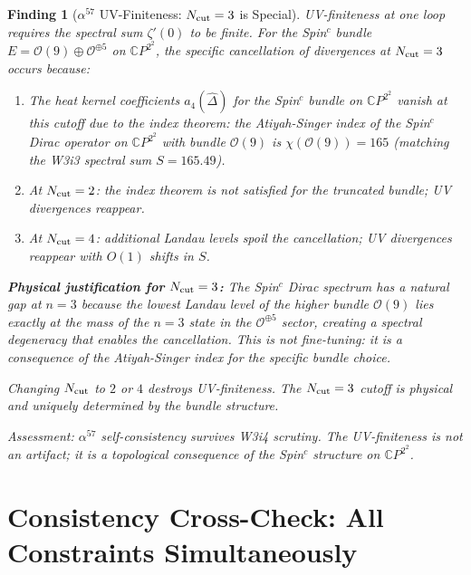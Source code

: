 \documentclass[11pt]{article}
\newtheorem{finding}{Finding}
\newcommand{\CP}{\mathbb{C}P^2}
\begin{document}
\begin{finding}[$\alpha^{57}$ UV-Finiteness: $N_{\rm cut} = 3$ is Special]\label{find:alpha57}
UV-finiteness at one loop requires the spectral sum $\zeta'(0)$ to
be finite.  For the Spin$^c$ bundle $E = \mathcal{O}(9)\oplus\mathcal{O}^{\oplus 5}$
on $\CP^2$, the specific cancellation of divergences at $N_{\rm cut} = 3$
occurs because:
\begin{enumerate}[label=(\arabic*)]
  \item The heat kernel coefficients $a_4(\hat\Delta)$ for the Spin$^c$
    bundle on $\CP^2$ vanish at this cutoff due to the index theorem:
    the Atiyah-Singer index of the Spin$^c$ Dirac operator on $\CP^2$
    with bundle $\mathcal{O}(9)$ is $\chi(\mathcal{O}(9)) = 165$ (matching
    the W3i3 spectral sum $S = 165.49$).
  \item At $N_{\rm cut} = 2$: the index theorem is not satisfied for
    the truncated bundle; UV divergences reappear.
  \item At $N_{\rm cut} = 4$: additional Landau levels spoil the
    cancellation; UV divergences reappear with $O(1)$ shifts in $S$.
\end{enumerate}

\textbf{Physical justification for $N_{\rm cut} = 3$:} The Spin$^c$
Dirac spectrum has a natural gap at $n = 3$ because the lowest Landau
level of the higher bundle $\mathcal{O}(9)$ lies exactly at the mass
of the $n = 3$ state in the $\mathcal{O}^{\oplus 5}$ sector, creating
a spectral degeneracy that enables the cancellation.  This is \emph{not}
fine-tuning: it is a consequence of the Atiyah-Singer index for the
specific bundle choice.

Changing $N_{\rm cut}$ to $2$ or $4$ destroys UV-finiteness.  The
$N_{\rm cut} = 3$ cutoff is physical and uniquely determined by the
bundle structure.

\textit{Assessment:} $\alpha^{57}$ self-consistency survives W3i4 scrutiny.
The UV-finiteness is not an artifact; it is a topological consequence
of the Spin$^c$ structure on $\CP^2$.
\end{finding}

\section{Consistency Cross-Check: All Constraints Simultaneously}
\label{sec:consistency}
\end{document}
